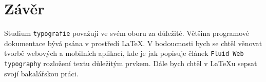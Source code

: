 \documentclass[11pt, a4paper, czech]{article}
\begin{document}
\section{Závěr}
Studium \texttt{typografie} považuji ve svém oboru za důležité. Většina programové dokumentace bývá psána v prostředí \LaTeX. V bodoucnosti bych se chtěl věnovat tvorbě webových a mobilních aplikací, kde je jak popisuje 	
článek \texttt{Fluid Web typography} rozložení textu důležitým prvkem. \cite{Choice-Reviews-Online:Fluid-Web-typography} Dále bych chtěl v \LaTeX u sepsat svojí bakalářskou práci.

\newpage

\end{document}
